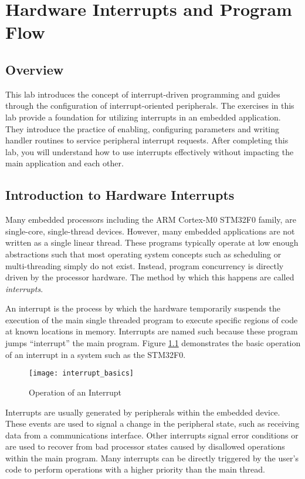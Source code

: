 \documentclass[11pt,fleqn]{book} %
\begin{document}
	
\chapter{Hardware Interrupts and Program Flow}

\section{Overview}
This lab introduces the concept of interrupt-driven programming and guides through the configuration of interrupt-oriented peripherals. The exercises in this lab provide a foundation for utilizing interrupts in an embedded application. They introduce the practice of enabling, configuring parameters and writing handler routines to service peripheral interrupt requests. After completing this lab, you will understand how to use interrupts effectively without impacting the main application and each other. 

\section{Introduction to Hardware Interrupts}
Many embedded processors including the ARM Cortex-M0 STM32F0 family, are single-core, single-thread devices. However, many embedded applications are not written as a single linear thread. These programs typically operate at low enough abstractions such that most operating system concepts such as scheduling or multi-threading simply do not exist. Instead, program concurrency is directly driven by the processor hardware. The method by which this happens are called \textit{interrupts}. 

An interrupt is the process by which the hardware temporarily suspends the execution of the main single threaded program to execute specific regions of code at known locations in memory. Interrupts are named such because these program jumps ``interrupt'' the main program. Figure \ref{interrupt_basics} demonstrates the basic operation of an interrupt in a system such as the STM32F0. 

\begin{figure}[h]
    \centering\texttt{[image: interrupt\_basics]}
    \caption{Operation of an Interrupt}
    \label{interrupt_basics}
\end{figure}

Interrupts are usually generated by peripherals within the embedded device. These events are used to signal a change in the peripheral state, such as receiving data from a communications interface. Other interrupts signal error conditions or are used to recover from bad processor states caused by disallowed operations within the main program. Many interrupts can be directly triggered by the user's code to perform operations with a higher priority than the main thread. 
\end{document}
